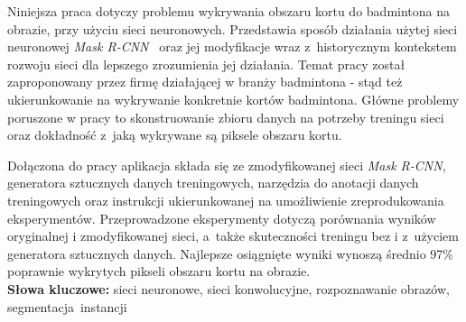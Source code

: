 Niniejsza praca dotyczy problemu wykrywania obszaru kortu do badmintona na obrazie, przy użyciu sieci neuronowych.
Przedstawia sposób działania użytej sieci neuronowej \textit{Mask R-CNN}~\cite{general-mask-rcnn} oraz jej modyfikacje wraz z~historycznym kontekstem rozwoju sieci dla lepszego zrozumienia jej działania.
Temat pracy został zaproponowany przez firmę \blue{} działającej w branży badmintona - stąd też ukierunkowanie na wykrywanie konkretnie kortów badmintona.
Główne problemy poruszone w pracy to skonstruowanie zbioru danych na potrzeby treningu sieci oraz dokładność z~jaką wykrywane są piksele obszaru kortu.

Dołączona do pracy aplikacja składa się ze zmodyfikowanej sieci \textit{Mask R-CNN}, generatora sztucznych danych treningowych, narzędzia do anotacji danych treningowych oraz instrukcji ukierunkowanej na umożliwienie zreprodukowania eksperymentów.
Przeprowadzone eksperymenty dotyczą porównania wyników oryginalnej i zmodyfikowanej sieci, a~także skuteczności treningu bez i z~użyciem generatora sztucznych danych.
Najlepsze osiągnięte wyniki wynoszą średnio 97\% poprawnie wykrytych pikseli obszaru kortu na obrazie.
\\

\noindent \textbf{Słowa kluczowe:} sieci neuronowe, sieci konwolucyjne, rozpoznawanie obrazów, segmentacja~instancji
